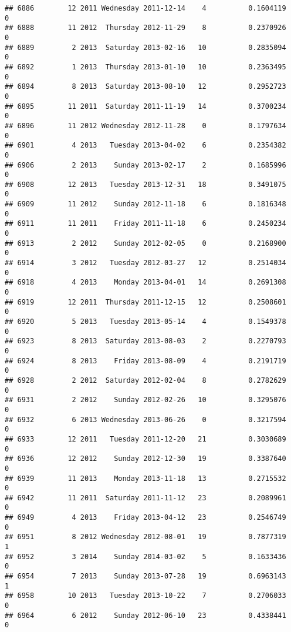 \documentclass[
]{article}
\begin{document}
\begin{verbatim}
## 6886        12 2011 Wednesday 2011-12-14    4          0.1604119             0
## 6888        11 2012  Thursday 2012-11-29    8          0.2370926             0
## 6889         2 2013  Saturday 2013-02-16   10          0.2835094             0
## 6892         1 2013  Thursday 2013-01-10   10          0.2363495             0
## 6894         8 2013  Saturday 2013-08-10   12          0.2952723             0
## 6895        11 2011  Saturday 2011-11-19   14          0.3700234             0
## 6896        11 2012 Wednesday 2012-11-28    0          0.1797634             0
## 6901         4 2013   Tuesday 2013-04-02    6          0.2354382             0
## 6906         2 2013    Sunday 2013-02-17    2          0.1685996             0
## 6908        12 2013   Tuesday 2013-12-31   18          0.3491075             0
## 6909        11 2012    Sunday 2012-11-18    6          0.1816348             0
## 6911        11 2011    Friday 2011-11-18    6          0.2450234             0
## 6913         2 2012    Sunday 2012-02-05    0          0.2168900             0
## 6914         3 2012   Tuesday 2012-03-27   12          0.2514034             0
## 6918         4 2013    Monday 2013-04-01   14          0.2691308             0
## 6919        12 2011  Thursday 2011-12-15   12          0.2508601             0
## 6920         5 2013   Tuesday 2013-05-14    4          0.1549378             0
## 6923         8 2013  Saturday 2013-08-03    2          0.2270793             0
## 6924         8 2013    Friday 2013-08-09    4          0.2191719             0
## 6928         2 2012  Saturday 2012-02-04    8          0.2782629             0
## 6931         2 2012    Sunday 2012-02-26   10          0.3295076             0
## 6932         6 2013 Wednesday 2013-06-26    0          0.3217594             0
## 6933        12 2011   Tuesday 2011-12-20   21          0.3030689             0
## 6936        12 2012    Sunday 2012-12-30   19          0.3387640             0
## 6939        11 2013    Monday 2013-11-18   13          0.2715532             0
## 6942        11 2011  Saturday 2011-11-12   23          0.2089961             0
## 6949         4 2013    Friday 2013-04-12   23          0.2546749             0
## 6951         8 2012 Wednesday 2012-08-01   19          0.7877319             1
## 6952         3 2014    Sunday 2014-03-02    5          0.1633436             0
## 6954         7 2013    Sunday 2013-07-28   19          0.6963143             1
## 6958        10 2013   Tuesday 2013-10-22    7          0.2706033             0
## 6964         6 2012    Sunday 2012-06-10   23          0.4338441             0

\end{verbatim}
\end{document}
